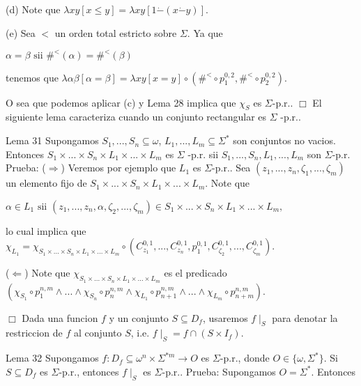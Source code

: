 (d) Note que \(\lambda xy\left[ x\leq y\right] =\lambda xy\left[ 1\dot{-}(x \dot{-}y)\right] .\)

(e) Sea \(< \) un orden total estricto sobre \(\Sigma .\) Ya que

\(\displaystyle \alpha =\beta \text{ sii }\#^{< }(\alpha )=\#^{< }(\beta ) \)

tenemos que
\(\displaystyle \lambda \alpha \beta \left[ \alpha =\beta \right] =\lambda xy\left[ x=y \right] \circ \left( \#^{< }\circ p_{1}^{0,2},\#^{< }\circ p_{2}^{0,2}\right) . \)

O sea que podemos aplicar (c) y Lema 28 implica que \(\chi _{S}\) es \( \Sigma \)-p.r.. \(\Box\)
El siguiente lema caracteriza cuando un conjunto rectangular es \(\Sigma \) -p.r..



Lema 31 Supongamos \(S_{1},...,S_{n}\subseteq \omega \), \( L_{1},...,L_{m}\subseteq \Sigma ^{\ast }\) son conjuntos no vacios. Entonces \( S_{1}\times ...\times S_{n}\times L_{1}\times ...\times L_{m}\) es \(\Sigma \) -p.r. sii \(S_{1},...,S_{n},L_{1},...,L_{m}\) son \(\Sigma \)-p.r.
Prueba: (\(\Rightarrow \)) Veremos por ejemplo que \(L_{1}\) es \(\Sigma \)-p.r.. Sea \( (z_{1},...,z_{n},\zeta _{1},...,\zeta _{m})\) un elemento fijo de \( S_{1}\times ...\times S_{n}\times L_{1}\times ...\times L_{m}.\) Note que

\(\displaystyle \alpha \in L_{1}\text{ sii }(z_{1},...,z_{n},\alpha ,\zeta _{2},...,\zeta _{m})\in S_{1}\times ...\times S_{n}\times L_{1}\times ...\times L_{m}, \)

lo cual implica que
\(\displaystyle \chi _{L_{1}}=\chi _{S_{1}\times ...\times S_{n}\times L_{1}\times ...\times L_{m}}\circ \left( C_{z_{1}}^{0,1},...,C_{z_{n}}^{0,1},p_{1}^{0,1},C_{\zeta _{2}}^{0,1},...,C_{\zeta _{m}}^{0,1}\right) . \)

(\(\Leftarrow \)) Note que \(\chi _{S_{1}\times ...\times S_{n}\times L_{1}\times ...\times L_{m}}\) es el predicado
\(\displaystyle \left( \chi _{S_{1}}\circ p_{1}^{n,m}\wedge ...\wedge \chi _{S_{n}}\circ p_{n}^{n,m}\wedge \chi _{L_{1}}\circ p_{n+1}^{n,m}\wedge ...\wedge \chi _{L_{m}}\circ p_{n+m}^{n,m}\right) . \)

\(\Box\)
Dada una funcion \(f\) y un conjunto \(S\subseteq D_{f}\), usaremos \(f\mid _{S}\) para denotar la restriccion de \(f\) al conjunto \(S\), i.e. \(f\mid _{S}=f\cap (S\times I_{f}).\)

Lema 32 Supongamos \(f:D_{f}\subseteq \omega ^{n}\times \Sigma ^{\ast m}\rightarrow O\) es \(\Sigma \)-p.r., donde \(O\in \{\omega ,\Sigma ^{\ast }\}.\) Si \(S\subseteq D_{f}\) es \(\Sigma \)-p.r., entonces \(f\mid _{S}\) es \(\Sigma \)-p.r..
Prueba: Supongamos \(O=\Sigma ^{\ast }\). Entonces

